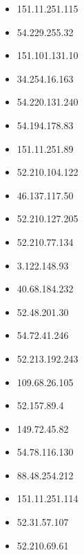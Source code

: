 \documentclass{article}
\begin{document}
\begin{itemize}
        \item 151.11.251.115
    
        \item 54.229.255.32
    
        \item 151.101.131.10
    
        \item 34.254.16.163
    
        \item 54.220.131.240
    
        \item 54.194.178.83
    
        \item 151.11.251.89
    
        \item 52.210.104.122
    
        \item 46.137.117.50
    
        \item 52.210.127.205
    
        \item 52.210.77.134
    
        \item 3.122.148.93
    
        \item 40.68.184.232
    
        \item 52.48.201.30
    
        \item 54.72.41.246
    
        \item 52.213.192.243
    
        \item 109.68.26.105
    
        \item 52.157.89.4
    
        \item 149.72.45.82
    
        \item 54.78.116.130
    
        \item 88.48.254.212
    
        \item 151.11.251.114
    
        \item 52.31.57.107
    
        \item 52.210.69.61
    

\end{itemize}
\end{document}
